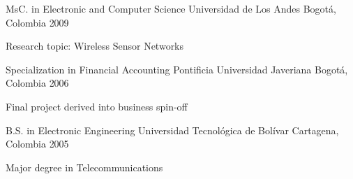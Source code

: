 

\begin{cventries}

  \cventry
    {MsC. in Electronic and Computer Science} %
    {Universidad de Los Andes} %
    {Bogotá, Colombia} %
    {2009} %
    {
      \begin{cvitems} %
        \item {Research topic: Wireless Sensor Networks}
      \end{cvitems}
    }

  \cventry
    {Specialization in Financial Accounting} %
    {Pontificia Universidad Javeriana} %
    {Bogotá, Colombia} %
    {2006} %
    {
      \begin{cvitems} %
        \item {Final project derived into business spin-off}
      \end{cvitems}
    }

  \cventry
    {B.S. in Electronic Engineering} %
    {Universidad Tecnológica de Bolívar} %
    {Cartagena, Colombia} %
    {2005} %
    {
      \begin{cvitems} %
        \item {Major degree in Telecommunications}
      \end{cvitems}
    }

\end{cventries}

